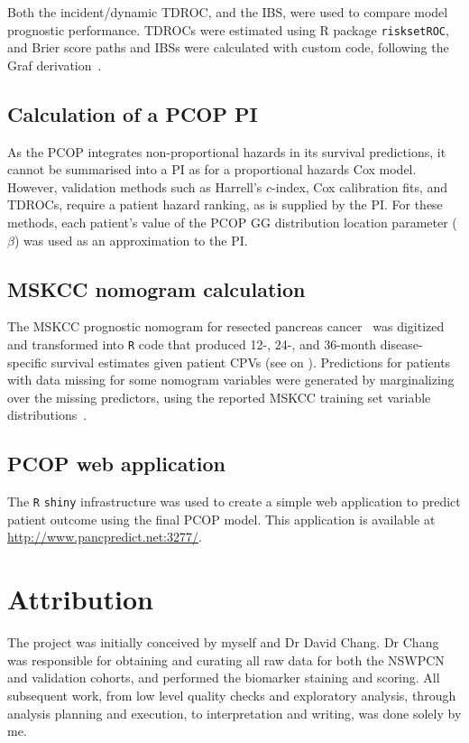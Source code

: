 \documentclass[dissertation.tex]{subfiles}
\begin{document}
Both the incident/dynamic \gls{TDROC}, and the \gls{IBS}, were used to compare model prognostic performance.  \glspl{TDROC} were estimated using R package \texttt{risksetROC}, and Brier score paths and \glspl{IBS} were calculated with custom code, following the Graf derivation~\cite{Graf1999}.

\subsection{Calculation of a \texorpdfstring{\acrshort{PCOP}}{PCOP} \texorpdfstring{\acrlong{PI}}{prognostic index}}
As the \gls{PCOP} integrates non-proportional hazards in its survival predictions, it cannot be summarised into a \gls{PI} as for a proportional hazards Cox model.  However, validation methods such as Harrell's $c$-index, Cox calibration fits, and \glspl{TDROC}, require a patient hazard ranking, as is supplied by the \gls{PI}.  For these methods, each patient's value of the \gls{PCOP} \gls{GG} distribution location parameter ($\beta$) was used as an approximation to the \gls{PI}.

\subsection{\texorpdfstring{\acrshort{MSKCC}}{MSKCC} nomogram calculation}
The \gls{MSKCC} prognostic nomogram for resected pancreas cancer~\cite{Brennan2004} was digitized and transformed into \texttt{R} code that produced 12-, 24-, and 36-month disease-specific survival estimates given patient \glspl{CPV} (see  on ).  Predictions for patients with data missing for some nomogram variables were generated by marginalizing over the missing predictors, using the reported \gls{MSKCC} training set variable distributions~\cite{Brennan2004}.

\subsection{\texorpdfstring{\acrshort{PCOP}}{PCOP} web application}
The \texttt{R} \texttt{shiny} infrastructure was used to create a simple web application to predict patient outcome using the final \gls{PCOP} model.  This application is available at \url{http://www.pancpredict.net:3277/}.  

\section{Attribution}
The project was initially conceived by myself and Dr David Chang.  Dr Chang was responsible for obtaining and curating all raw data for both the \gls{NSWPCN} and validation cohorts, and performed the biomarker staining and scoring.  All subsequent work, from low level quality checks and exploratory analysis, through analysis planning and execution, to interpretation and writing, was done solely by me.
\end{document}
